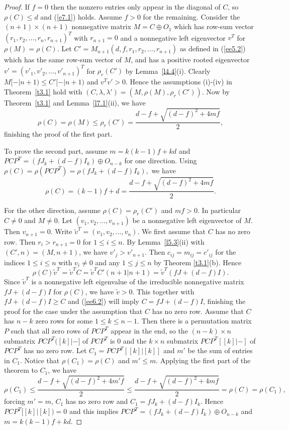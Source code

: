 \documentclass[final,3p, times, 12pt]{elsarticle}
\theoremstyle{plain}
\theoremstyle{definition}
\theoremstyle{remark}
\numberwithin{equation}{section}
\begin{document}
\begin{proof} If $f=0$ then the nonzero entries only appear in the diagonal of $C$, so $\rho(C)\leq d$ and
(\ref{e7.1}) holds. Assume $f>0$ for the remaining.
Consider the $(n+1)\times (n+1)$ nonnegative matrix $M=C\oplus O_1$ which  has row-sum vector $(r_1,r_2,\ldots,r_n,r_{n+1})^T$ with $r_{n+1}=0$ and  a nonnegative left eigenvector $v^T$ for $\rho(M)=\rho(C)$.
Let $C'=M_{n+1}(d, f, r_1, r_2, \ldots, r_{n+1})$ as defined in (\ref{ee5.2}) which has the same row-sum vector of $M$, and has a positive rooted eigenvector $v'=(v'_1, v'_2, \ldots, v'_{n+1})^T$ for $\rho_r(C')$ by Lemma~\ref{l4.4}(i).
Clearly $M[-|n+1)\leq C'[-|n+1)$ and $v^Tv'>0.$ Hence the assumptions (i)-(iv) in Theorem~\ref{t3.1}
hold with $(C, \lambda, \lambda')=(M, \rho(M), \rho_r(C'))$.
 Now by Theorem~\ref{t3.1} and Lemma~\ref{l7.1}(ii), we have
$$\rho(C)=\rho(M)\leq \rho_r(C')=\frac{d-f+\sqrt{(d-f)^2+4mf}}{2},$$
finishing the proof of the first part.

To prove the second part, assume $m=k(k-1)f+kd$ and $PCP^T=(fJ_k+(d-f)I_k)\oplus O_{n-k}$ for one direction.
Using $\rho(C)=\rho(PCP^T)=\rho(fJ_k+(d-f)I_k),$ we have
$$\rho(C)=(k-1)f+d=\frac{d-f+\sqrt{(d-f)^2+4mf}}{2}.$$

For the other direction, assume $\rho(C)=\rho_r(C')$ and $mf>0$. In particular $C\not=0$ and $M\not=0$.
Let $(v_1, v_2, \ldots, v_{n+1})$ be a nonnegative left eigenvector of $M$. Then $v_{n+1}=0$.
 Write $\tilde{v}^T=(v_1, v_2, \ldots,v_n)$.
We first assume that $C$ has no zero row. Then $r_i>r_{n+1}=0$ for $1\leq i\leq n$. By Lemma~\ref{l5.3}(ii) with
$(C', n)=(M, n+1)$,  we have $v'_j>v'_{n+1}$. Then
$c_{ij}=m_{ij}=c'_{ij}$ for the indices $1\leq i\leq n$ with $v_i\not=0$ and any $1\leq j\leq n$ by Theorem \ref{t3.1}(b).
Hence
\begin{equation}\label{ee6.2}\rho(C)\tilde{v}^T=\tilde{v}^TC=\tilde{v}^TC'(n+1|n+1)=\tilde{v}^T(fJ+(d-f)I).\end{equation}
 Since $\tilde{v}^T$ is a nonnegative left eigenvalue of the irreducible nonnegative matrix $fJ+(d-f)I$ for $\rho(C)$, we have  $\tilde{v}>0$. This together with $fJ+(d-f)I\geq C$ and (\ref{ee6.2}) will imply
$C=fJ+(d-f)I$, finishing the proof for the case under the assumption that $C$ has no zero row.
Assume that $C$ has $n-k$ zero rows for some $1\leq k\leq n-1$. Then there is a permutation matrix $P$ such that all zero rows of $PCP^T$ appear in the end, so the $(n-k)\times n$ submatrix  $PCP^T([k]|-]$ of $PCP^T$ is $0$ and the $k\times n$ submatrix $PCP^T[[k]|-]$ of $PCP^T$  has no zero row. Let $C_1=PCP^T[[k]|[k]]$
and $m'$ be the sum of entries in $C_1$. Notice that $\rho(C_1)=\rho(C)$ and  $m'\leq m$.
Applying the first part of the theorem to $C_1$, we have
$$\rho(C_1)\leq \frac{d-f+\sqrt{(d-f)^2+4m'f}}{2}\leq \frac{d-f+\sqrt{(d-f)^2+4mf}}{2}=\rho(C)=\rho(C_1),$$
forcing $m'=m$, $C_1$ has no zero row and $C_1=fJ_k+(d-f)I_k$.  Hence $PCP^T[[k]|[k])=0$ and this implies  $PCP^T=(fJ_k+(d-f)I_k)\oplus O_{n-k}$ and  $m=k(k-1)f+kd$.
\end{proof}
\end{document}
